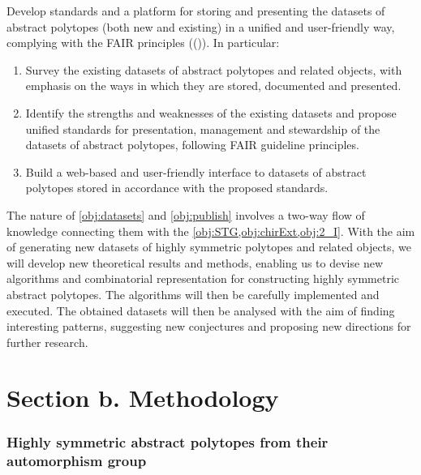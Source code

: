 \documentclass[a4paper,12pt,english]{article}
\begin{document}
\begin{obj}\label{obj:publish}
Develop standards and a platform for storing and presenting the datasets of abstract polytopes
 (both new and existing) in a unified and user-friendly way, complying with the FAIR principles ((\cite{BercKohRab2020_DeepFairMathematics,WDAAABBBSB2016_FairGuidingPrinciples})). In particular:

\begin{enumerate}[label=\textit{(\roman*)}]

\item  Survey the existing datasets of abstract polytopes and related objects, with emphasis on the ways in which they are stored, documented and presented.
\item
Identify the strengths and weaknesses of the existing datasets and propose unified standards for presentation, management and stewardship of the
datasets of abstract polytopes, following FAIR guideline principles.
\item Build a web-based and user-friendly interface to datasets of abstract polytopes stored in accordance with the proposed standards.

\end{enumerate}
\end{obj}

The nature of \cref{obj:datasets} and \cref{obj:publish} involves a two-way flow of knowledge connecting them with the \cref{obj:STG,obj:chirExt,obj:2_I}.
With the aim of generating new datasets of highly symmetric polytopes and related objects, we will develop new theoretical results and methods, enabling us to devise new algorithms and combinatorial representation for constructing highly symmetric abstract polytopes.
The algorithms will then be carefully implemented and executed.
The obtained datasets will then be analysed with the aim of finding interesting patterns, suggesting new conjectures and proposing new directions for further research. 



\section*{Section b. Methodology}

\subsubsection*{Highly symmetric abstract polytopes from their automorphism group}
\end{document}
